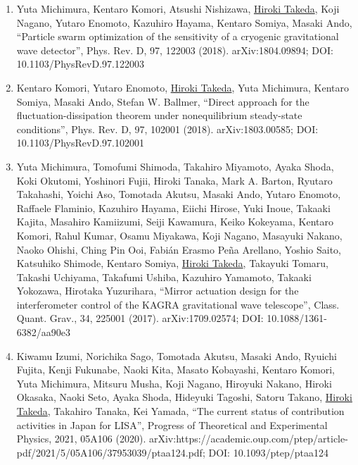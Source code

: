 \documentclass[uplatex, 12pt]{article}
\begin{document}
\begin{enumerate}
\item Yuta Michimura, Kentaro Komori, Atsushi Nishizawa, \uline{Hiroki Takeda}, Koji Nagano, Yutaro Enomoto, Kazuhiro Hayama, Kentaro Somiya, Masaki Ando, “Particle swarm optimization of the sensitivity of a cryogenic gravitational wave detector”, Phys. Rev. D, 97, 122003 (2018). arXiv:1804.09894; DOI: 10.1103/PhysRevD.97.122003
\item Kentaro Komori, Yutaro Enomoto, \uline{Hiroki Takeda}, Yuta Michimura, Kentaro Somiya, Masaki Ando, Stefan W. Ballmer, “Direct approach for the fluctuation-dissipation theorem under nonequilibrium steady-state conditions”, Phys. Rev. D, 97, 102001 (2018). arXiv:1803.00585; DOI: 10.1103/PhysRevD.97.102001
\item Yuta Michimura, Tomofumi Shimoda, Takahiro Miyamoto, Ayaka Shoda, Koki Okutomi, Yoshinori Fujii, Hiroki Tanaka, Mark A. Barton, Ryutaro Takahashi, Yoichi Aso, Tomotada Akutsu, Masaki Ando, Yutaro Enomoto, Raffaele Flaminio, Kazuhiro Hayama, Eiichi Hirose, Yuki Inoue, Takaaki Kajita, Masahiro Kamiizumi, Seiji Kawamura, Keiko Kokeyama, Kentaro Komori, Rahul Kumar, Osamu Miyakawa, Koji Nagano, Masayuki Nakano, Naoko Ohishi, Ching Pin Ooi, Fabián Erasmo Peña Arellano, Yoshio Saito, Katsuhiko Shimode, Kentaro Somiya, \uline{Hiroki Takeda}, Takayuki Tomaru, Takashi Uchiyama, Takafumi Ushiba, Kazuhiro Yamamoto, Takaaki Yokozawa, Hirotaka Yuzurihara, “Mirror actuation design for the interferometer control of the KAGRA gravitational wave telescope”, Class. Quant. Grav., 34, 225001 (2017). arXiv:1709.02574; DOI: 10.1088/1361-6382/aa90e3
\item Kiwamu Izumi, Norichika Sago, Tomotada Akutsu, Masaki Ando, Ryuichi Fujita, Kenji Fukunabe, Naoki Kita, Masato Kobayashi, Kentaro Komori, Yuta Michimura, Mitsuru Musha, Koji Nagano, Hiroyuki Nakano, Hiroki Okasaka, Naoki Seto, Ayaka Shoda, Hideyuki Tagoshi, Satoru Takano, \uline{Hiroki Takeda}, Takahiro Tanaka, Kei Yamada, “The current status of contribution activities in Japan for LISA”, Progress of Theoretical and Experimental Physics, 2021, 05A106 (2020). arXiv:https://academic.oup.com/ptep/article-pdf/2021/5/05A106/37953039/ptaa124.pdf; DOI: 10.1093/ptep/ptaa124
\end{enumerate}
\end{document}
